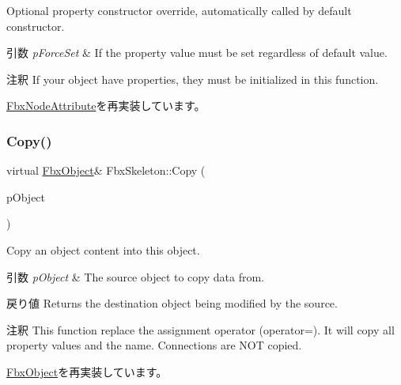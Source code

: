 Optional property constructor override, automatically called by default constructor. 
\begin{DoxyParams}{引数}
{\em p\+Force\+Set} & If the property value must be set regardless of default value. \\
\hline
\end{DoxyParams}
\begin{DoxyRemark}{注釈}
If your object have properties, they must be initialized in this function. 
\end{DoxyRemark}


\hyperlink{class_fbx_node_attribute_a042eb9949a9b9634dcc5f126e82fd04a}{Fbx\+Node\+Attribute}を再実装しています。

\mbox{\label{class_fbx_skeleton_a86ed7d693e2f77267a7e07c0db5023d7}} 
\subsubsection{\texorpdfstring{Copy()}{Copy()}}
{\footnotesize\ttfamily virtual \hyperlink{class_fbx_object}{Fbx\+Object}\& Fbx\+Skeleton\+::\+Copy (\begin{DoxyParamCaption}\item[{const \hyperlink{class_fbx_object}{Fbx\+Object} \&}]{p\+Object }\end{DoxyParamCaption})\hspace{0.3cm}{\ttfamily [virtual]}}

Copy an object content into this object. 
\begin{DoxyParams}{引数}
{\em p\+Object} & The source object to copy data from. \\
\hline
\end{DoxyParams}
\begin{DoxyReturn}{戻り値}
Returns the destination object being modified by the source. 
\end{DoxyReturn}
\begin{DoxyRemark}{注釈}
This function replace the assignment operator (operator=). It will copy all property values and the name. Connections are N\+OT copied. 
\end{DoxyRemark}


\hyperlink{class_fbx_object_a0c0c5adb38284d14bb82c04d54504a3e}{Fbx\+Object}を再実装しています。

\mbox{\label{class_fbx_skeleton_a3ff6cd0cae408860585d954b7249a4d9}} 
